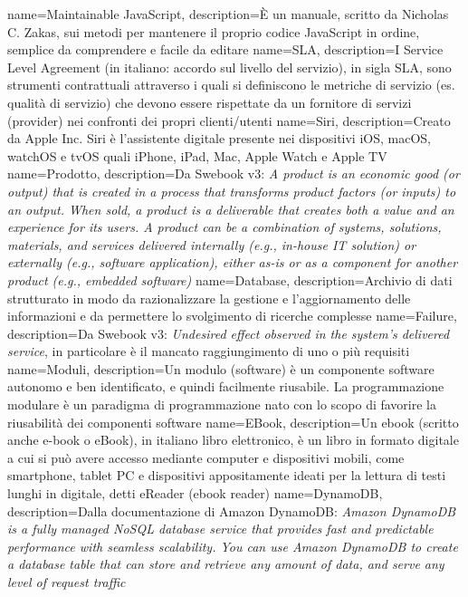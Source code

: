  {
	name=Maintainable JavaScript,
	description={È un manuale, scritto da Nicholas C. Zakas, sui metodi per mantenere il proprio codice JavaScript in ordine, semplice da comprendere e facile da editare}
}
 {
	name=SLA,
	description={I Service Level Agreement (in italiano: accordo sul livello del servizio), in sigla SLA, sono strumenti contrattuali attraverso i quali si definiscono le metriche di servizio (es. qualità di servizio) che devono essere rispettate da un fornitore di servizi (provider) nei confronti dei propri clienti/utenti}
}
 {
	name=Siri,
	description={Creato da Apple Inc. Siri è l'assistente digitale presente nei dispositivi iOS, macOS, watchOS e tvOS quali iPhone, iPad, Mac, Apple Watch e Apple TV}
}
 {
	name=Prodotto,
	description={Da Swebook v3: \textit{A product is an economic good (or output) that is created in a process that transforms product factors (or inputs) to an output. When sold, a product is a deliverable that creates both a value and an experience for its users. A product can be a combination of systems, solutions, materials, and services delivered internally (e.g., in-house IT solution) or externally (e.g., software application), either as-is or as a component for another
product (e.g., embedded software)}}
}
 {
	name=Database,
	description={Archivio di dati strutturato in modo da razionalizzare la gestione e l'aggiornamento delle informazioni e da permettere lo svolgimento di ricerche complesse}
}
 {
	name=Failure,
	description={Da Swebook v3: \textit{Undesired effect observed in the system’s delivered service}, in particolare è il mancato raggiungimento di uno o più requisiti}
}
 {
	name=Moduli,
	description={Un modulo (software) è un componente software autonomo e ben identificato, e quindi facilmente riusabile. La programmazione modulare è un paradigma di programmazione nato con lo scopo di favorire la riusabilità dei componenti software}
}
 {
	name=EBook,
	description={Un ebook (scritto anche e-book o eBook), in italiano libro elettronico, è un libro in formato digitale a cui si può avere accesso mediante computer e dispositivi mobili, come smartphone, tablet PC e dispositivi appositamente ideati per la lettura di testi lunghi in digitale, detti eReader (ebook reader)}
}
 {
	name=DynamoDB,
	description={Dalla documentazione di Amazon DynamoDB: \textit{Amazon DynamoDB is a fully managed NoSQL database service that provides fast and predictable performance with seamless scalability. You can use Amazon DynamoDB to create a database table that can store and retrieve any amount of data, and serve any level of request traffic}}
}
